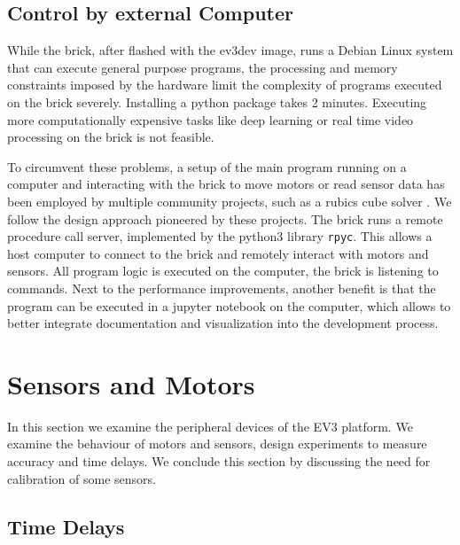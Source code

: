 \documentclass[11pt, a4paper]{article}
\begin{document}
\subsection{Control by external Computer}
While the brick, after flashed with the ev3dev image, runs a Debian Linux system that can execute general purpose programs, the processing and memory constraints imposed by the hardware limit the complexity of programs executed on the brick severely. Installing a python package takes 2 minutes. Executing more computationally expensive tasks like deep learning or real time video processing on the brick is not feasible.

To circumvent these problems, a setup of the main program running on a computer and interacting with the brick to move motors or read sensor data has been employed by multiple community projects, such as a rubics cube solver \cite{ev3_rubics}. We follow the design approach pioneered by these projects. The brick runs a remote procedure call server, implemented by the python3 library \texttt{rpyc}. This allows a host computer to connect to the brick and remotely interact with motors and sensors. All program logic is executed on the computer, the brick is listening to commands. Next to the performance improvements, another benefit is that the program can be executed in a jupyter notebook on the computer, which allows to better integrate documentation and visualization into the development process.

\section{Sensors and Motors}
In this section we examine the peripheral devices of the EV3 platform. We examine the behaviour of motors and sensors, design experiments to measure accuracy and time delays. We conclude this section by discussing the need for calibration of some sensors.
\subsection{Time Delays}
\end{document}
